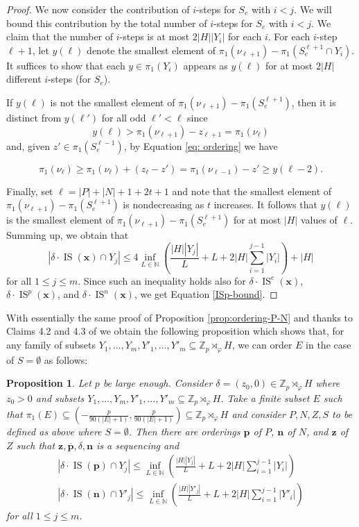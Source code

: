 \documentclass[11pt]{amsart}
\newtheorem{proposition}[theorem]{Proposition}
\theoremstyle{definition}
\newcommand{\bp}{\mathbf{p}}
\newcommand{\bn}{\mathbf{n}}
\newcommand{\bx}{\mathbf{x}}
\DeclareMathOperator{\IS}{IS}
\begin{document}
\begin{proof}
We now consider the contribution of $i$-steps for $S_e$ with $i<j$.  We will bound this contribution by the total number of $i$-steps for $S_e$ with $i<j$.  We claim that the number of $i$-steps is at most $2|H||Y_i|$ for each $i$.  For each $i$-step $\ell+1$,
let $y(\ell)$ denote the smallest element of $\pi_1(\nu_{\ell+1})-\pi_1(S_e^{\ell+1} \cap Y_i)$.  It suffices to show that each $y \in \pi_1(Y_i)$ appears as $y(\ell)$ for at most $2|H|$ different $i$-steps (for $S_e$).

If $y(\ell)$ is not the smallest element of $\pi_1(\nu_{\ell+1})-\pi_1(S_e^{\ell+1})$, then it is distinct from $y(\ell')$ for all odd $\ell'<\ell$ since
$$y(\ell)>\pi_1(\nu_{\ell+1})-z_{\ell+1}=\pi_1(\nu_{\ell})$$
and, given $z'\in\pi_1(S_e^{\ell-1})$, by Equation \eqref{eq: ordering} we have

$$\pi_1(\nu_{\ell}) \geq \pi_1(\nu_{\ell})+(z_{\ell}-z')=\pi_1(\nu_{\ell-1})-z' \geq y(\ell-2).$$

Finally, set $\ell=|P|+|N|+1+2t+1$ and note that the smallest element of $\pi_1(\nu_{\ell+1})-\pi_1(S_e^{\ell+1})$ is nondecreasing as $t$ increases.
It follows that $y(\ell)$ is the smallest element of $\pi_1(\nu_{\ell+1})-\pi_1(S_e^{\ell+1})$ for at most $|H|$ values of $\ell$.
Summing up, we obtain that
$$|\delta\cdot\IS(\bx) \cap Y_j| \leq 4\inf_{L \in \mathbb{N}} \left(\frac{|H| |Y_j|}{L}+L+2|H|\sum_{i=1}^{j-1}|Y_i|\right) + |H|$$
for all $1 \leq j \leq m$. Since such an inequality holds also for $\delta\cdot\IS^{e}(\bx)$, $\delta\cdot\IS^{p}(\bx)$, and $\delta\cdot\IS^{n}(\bx)$, we get Equation \eqref{ISp-bound}.
\end{proof}

With essentially the same proof of Proposition \ref{prop:ordering-P-N} and thanks to Claims 4.2 and 4.3 of \cite{BK} we obtain the following proposition which shows that, for any family of subsets $Y_1, \ldots, Y_m, Y'_1, \ldots, Y'_m \subseteq \mathbb{Z}_p \rtimes_\varphi H$, we can order $E$ in the case of $S=\emptyset$ as follows:

\begin{proposition}\label{prop:ordering-P-N-S-empty} Let $p$ be large enough. Consider $\delta=(z_0,0)\in \mathbb{Z}_{p} \rtimes_{\varphi} H$ where  $z_0>0$ and subsets $Y_1, \ldots, Y_m, Y'_1, \ldots, Y'_m \subseteq \mathbb{Z}_{p} \rtimes_{\varphi} H$. Take a finite subset $E$ such that $\pi_1(E)\subseteq\left(-\frac{p}{90(|E|+1)},\frac{p}{90(|E|+1)}\right)\subseteq \mathbb{Z}_{p} \rtimes_{\varphi} H$ and consider $P,N,Z,S$ to be defined as above where $S = \emptyset$.
 Then there are orderings $\bp$ of $P$, $\bn$ of $N$, and $\mathbf{z}$ of $Z$ such that $\mathbf{z}, \overline{\bp}, \delta, \bn$ is a sequencing and
\begin{align}
\label{ISp-bound-D-1}
|\delta\cdot\IS(\bp) \cap Y_j| \leq \inf_{L \in \mathbb{N}} \left(\frac{|H| |Y_j|}{L}+L+2|H|\sum_{i=1}^{j-1}|Y_i|\right)\\
\label{ISp-bound-D-2}
|\delta\cdot\IS(\bn) \cap Y'_j| \leq \inf_{L \in \mathbb{N}} \left(\frac{|H| |Y'_j|}{L}+L+2|H|\sum_{i=1}^{j-1}|Y'_i|\right)
\end{align}
for all $1 \leq j \leq m$.
\end{proposition}
\end{document}
